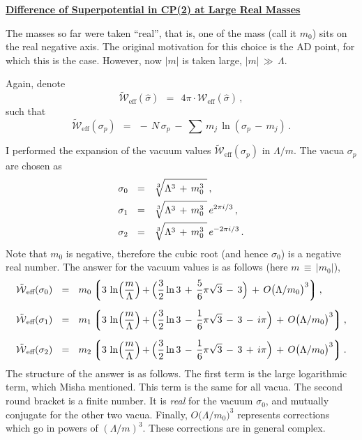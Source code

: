 \documentclass[12pt]{article}
\def\beq{\begin{equation}}
\def\eeq{\end{equation}}
\newcommand{\mc}[1]{\mathcal{#1}}
\newcommand{\lgr}{\left\lgroup}
\newcommand{\rgr}{\right\rgroup}
\newcommand{\hsigma}{{\hat{\sigma}}}
\newcommand{\ww}{\tilde{\mc{W}}{}_\text{eff}}
\begin{document}
{\bf\centering
\large\underline{Difference of Superpotential in CP(2) at Large Real Masses}}
\vspace{1.0cm}

	The masses so far were taken ``real'', that is, one of the mass (call it $m_0$) sits
	on the real negative axis. 
	The original motivation for this choice is the AD point, for which this is the case.
	However, now $ |m| $ is taken large, $ | m | \,\gg\, \Lambda $.

	Again, denote
\beq
	\ww (\hsigma) ~~=~~ 4\pi \cdot \mc{W}_\text{eff}(\hsigma)\,,
\eeq
	such that
\beq
	\ww (\sigma_p) ~~=~~ -\, N\, \sigma_p ~-~ \sum\, m_j\, \ln (\sigma_p \,-\, m_j)\,.
\eeq

	I performed the expansion of the vacuum values $ \ww(\sigma_p) $ in $ \Lambda / m $.
	The vacua $ \sigma_p $ are chosen as
\begin{align}
%
\notag
	\sigma_0 & ~~=~~ \sqrt[3]{\Lambda^3 \,+\, m_0^3~} \,,  \\
%
	\sigma_1 & ~~=~~ \sqrt[3]{\Lambda^3 \,+\, m_0^3~} \, e^{2\pi i /3}\,, \\
%
	\sigma_2 & ~~=~~ \sqrt[3]{\Lambda^3 \,+\, m_0^3~} \, e^{- 2\pi i /3}\,.
\notag
\end{align}
	Note that $ m_0 $ is negative, therefore the cubic root (and hence $\sigma_0$) is a negative
	real number.
	The answer for the vacuum values is as follows (here $ m \,\equiv\, |m_0|$),
\begin{align}
%
\label{vval}
	\ww(\sigma_0) & ~~=~~ m_0 
	\lgr   3\,\ln \Bigl(\frac{m}{\Lambda}\Bigl) \,+\,
\Bigl(\frac{3}{2} \ln 3 \,+\, \frac{5}{6} \pi \sqrt{3} \,-\, 3 \Bigr)
\,+\, O \bigl( \Lambda/m_0 \bigr)^3 \rgr ,
	\\[2mm]
%
\notag
	\ww(\sigma_1) & ~~=~~ m_1 
	\lgr   3\,\ln \Bigl(\frac{m}{\Lambda}\Bigl) \,+\,
\Bigl(\frac{3}{2} \ln 3 \,-\, \frac{1}{6} \pi \sqrt{3} \,-\, 3 \,-\, i\pi \Bigr)
\,+\, O \bigl( \Lambda/m_0 \bigr)^3 \rgr ,
	\\[2mm]
%
\notag
	\ww(\sigma_2) & ~~=~~ m_2
	\lgr   3\,\ln \Bigl(\frac{m}{\Lambda}\Bigl) \,+\,
\Bigl(\frac{3}{2} \ln 3 \,-\, \frac{1}{6} \pi \sqrt{3} \,-\, 3 \,+\, i\pi \Bigr)
\,+\, O \bigl( \Lambda/m_0 \bigr)^3 \rgr .
\end{align}
	The structure of the answer is as follows. 
	The first term is the large logarithmic term, which Misha mentioned.
	This term is the same for all vacua.
	The second round bracket is a finite number. 
	It is {\it real} for the vacuum $ \sigma_0 $, and mutually conjugate for the other two vacua.
	Finally, $ O \bigl( \Lambda/m_0 \bigr)^3 $ represents corrections which go in powers
	of $ (\Lambda/m)^3 $.
	These corrections are in general complex.
\end{document}
